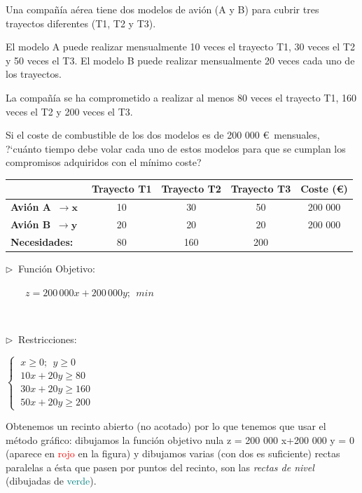 \vspace{10mm}
\begin{ejemplo}
\begin{ejer}
	Una compañía aérea tiene dos modelos de avión (A y B) para cubrir tres trayectos diferentes (T1, T2 y T3).

El modelo A puede realizar mensualmente 10 veces el trayecto T1, 30 veces el T2 y 50 veces el T3. El modelo B puede realizar mensualmente 20 veces cada uno
de los trayectos. 

La compañía se ha comprometido a realizar al menos 80 veces el trayecto T1, 160 veces el T2 y 200 veces el T3.

Si el coste de combustible de los dos modelos es de 200 000 \euro$\,$ mensuales, ?`cuánto tiempo debe volar cada uno de estos modelos para que se cumplan
los compromisos adquiridos con el mínimo coste?
\end{ejer}	
\end{ejemplo}
\vspace{5mm}
\begin{table}[H]
\centering
\begin{tabular}{lcccc}
 & \textbf{Trayecto T1} & \textbf{Trayecto T2} & \textbf{Trayecto T3} & \textbf{Coste (\euro)} \\ \hline
\textbf{Avión A} $\ \to \boldsymbol x \: \ $ & 10 & 30 & 50 & 200 000 \\
\textbf{Avión B} $\ \to \boldsymbol y \: \ $ & 20 & 20 & 20 & 200 000 \\ \cline{2-4}
\textbf{Necesidades:} & 80 & 160 & 200 & 
\end{tabular}
\end{table}

\vspace{5mm}
\begin{multicols}{2}
$\triangleright \ $	Función Objetivo:

$\qquad z=200 \, 000 x+200 \, 000y ;\ \ min$

$\, $

$\triangleright \ $ Restricciones:

$\begin{cases} \ x \ge 0; \ \ y \ge 0 \\ \ 10x+20y\ge 80 \\ \ 30x+20y\ge 160 \\ \ 50x+20y\ge 200 \end{cases}$
\end{multicols}

\vspace{5mm}
\vspace{5mm} Obtenemos un recinto abierto (no acotado) por lo que tenemos que usar el método gráfico: dibujamos la función objetivo nula z = 200 000 x+200 000 y = 0 (aparece en \textcolor{red}{rojo} en la figura) y dibujamos varias (con dos es suficiente) rectas paralelas a ésta que pasen por puntos del recinto, son las \emph{rectas de nivel} (dibujadas de \textcolor{teal}{verde}).

